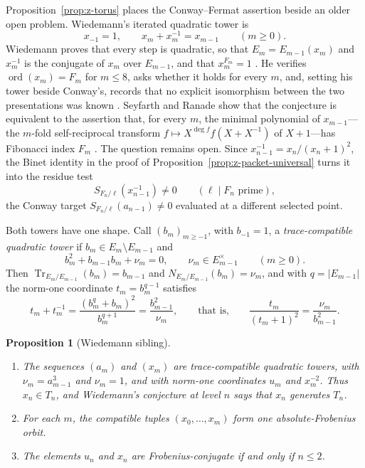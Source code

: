 \documentclass[11pt]{article}
\newtheorem{proposition}[theorem]{Proposition}
\theoremstyle{definition}
\theoremstyle{remark}
\begin{document}
Proposition~\ref{prop:z-torus} places the Conway--Fermat assertion beside an
older open problem.  Wiedemann's iterated quadratic tower is
\[
 x_{-1}=1,\qquad x_m+x_m^{-1}=x_{m-1}\qquad(m\geq0).
\]
Wiedemann proves that every step is quadratic, so that $E_m=E_{m-1}(x_m)$
and $x_m^{-1}$ is the conjugate of $x_m$ over $E_{m-1}$, and that
$x_m^{F_m}=1$ \cite[Theorem~1 and Corollary]{wiedemann1988}.  He verifies
$\operatorname{ord}(x_m)=F_m$ for $m\leq8$, asks whether it holds for every
$m$, and, setting his tower beside Conway's, records that no explicit
isomorphism between the two presentations was known
\cite[Sections~4--5]{wiedemann1988}.  Seyfarth and Ranade show that the
conjecture is equivalent to the assertion that, for every $m$, the minimal
polynomial of $x_{m-1}$---the $m$-fold self-reciprocal transform
$f\mapsto X^{\deg f}f(X+X^{-1})$ of $X+1$---has Fibonacci index $F_m$
\cite[Theorem~2]{seyfarthranade2012}.  The question remains open.  Since
$x_{n-1}^{-1}=x_n/(x_n+1)^2$, the Binet identity in the proof of
Proposition~\ref{prop:z-packet-universal} turns it into the residue test
\[
 S_{F_n/\ell}(x_{n-1}^{-1})\ne0
 \qquad(\ell\mid F_n\text{ prime}),
\]
the Conway target $S_{F_n/\ell}(a_{n-1})\ne0$ evaluated at a different
selected point.

Both towers have one shape.  Call $(b_m)_{m\geq-1}$, with $b_{-1}=1$, a
\emph{trace-compatible quadratic tower} if $b_m\in E_m\setminus E_{m-1}$ and
\[
 b_m^2+b_{m-1}b_m+\nu_m=0,
 \qquad \nu_m\in E_{m-1}^{\times}\qquad(m\geq0).
\]
Then $\operatorname{Tr}_{E_m/E_{m-1}}(b_m)=b_{m-1}$ and
$N_{E_m/E_{m-1}}(b_m)=\nu_m$, and with $q=|E_{m-1}|$ the norm-one coordinate
$t_m=b_m^{q-1}$ satisfies
\[
 t_m+t_m^{-1}=\frac{(b_m^q+b_m)^2}{b_m^{q+1}}=\frac{b_{m-1}^2}{\nu_m},
 \qquad\text{that is,}\qquad
 \frac{t_m}{(t_m+1)^2}=\frac{\nu_m}{b_{m-1}^2}.
\]

\begin{proposition}[Wiedemann sibling]\label{prop:z-wiedemann}
\begin{enumerate}
\item[(a)] The sequences $(a_m)$ and $(x_m)$ are trace-compatible quadratic
  towers, with $\nu_m=a_{m-1}^3$ and $\nu_m=1$, and with norm-one
  coordinates $u_m$ and $x_m^{-2}$.  Thus $x_n\in T_n$, and Wiedemann's
  conjecture at level $n$ says that $x_n$ generates $T_n$.
\item[(b)] For each $m$, the compatible tuples $(x_0,\ldots,x_m)$ form one
  absolute-Frobenius orbit.
\item[(c)] The elements $u_n$ and $x_n$ are Frobenius-conjugate if and only
  if $n\leq2$.
\end{enumerate}
\end{proposition}
\end{document}
